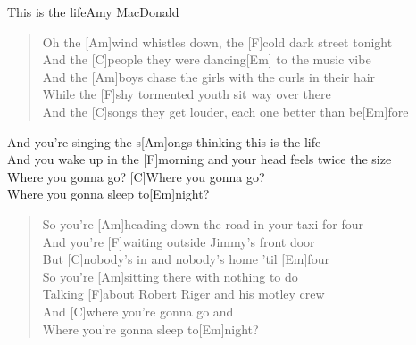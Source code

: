 \begin{song}{This is the life}{Amy MacDonald}

    \begin{intro}
        [Am F C Em] 
    \end{intro}

    \begin{verse}  
        Oh the [Am]wind whistles down, the [F]cold dark street tonight \\
        And the [C]people they were dancing[Em] to the music vibe \\
        And the [Am]boys chase the girls with the curls in their hair \\
        While the [F]shy tormented youth sit way over there \\
        And the [C]songs they get louder, each one better than be[Em]fore
    \end{verse}  

    \begin{chorus}
        And you're singing the s[Am]ongs thinking this is the life \\
        And you wake up in the [F]morning and your head feels twice the size \\
        Where you gonna go? [C]Where you gonna go? \\
        Where you gonna sleep to[Em]night?
    \end{chorus}

    \begin{instrumental}
        [(Am) F C Em]  
    \end{instrumental}

    \begin{verse}  
        So you're [Am]heading down the road in your taxi for four \\
        And you're [F]waiting outside Jimmy's front door \\
        But [C]nobody's in and nobody's home 'til [Em]four \\
        So you're [Am]sitting there with nothing to do \\
        Talking [F]about Robert Riger and his motley crew \\
        And [C]where you're gonna go and \\
        Where you're gonna sleep to[Em]night?
    \end{verse}  


    \begin{instrumental}
        [(Am) F C Em Am F C Em] 
    \end{instrumental}


    \begin{instrumental}
        [(Am) F C Em Am]  
    \end{instrumental}

\end{song}
